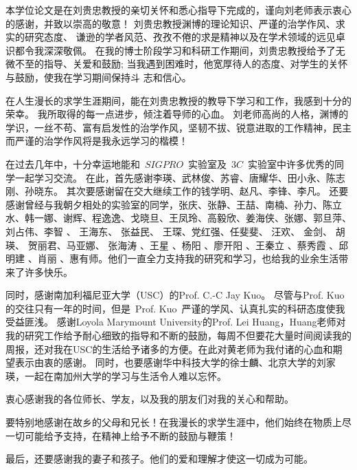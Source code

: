 \par 本学位论文是在刘贵忠教授的亲切关怀和悉心指导下完成的，谨向刘老师表示衷心的感谢，并致以崇高的敬意！
刘贵忠教授渊博的理论知识、严谨的治学作风、求实的研究态度、
谦逊的学者风范、孜孜不倦的求是精神以及在学术领域的远见卓识都令我深深敬佩。
在我的博士阶段学习和科研工作期间，刘贵忠教授给予了无微不至的指导、关爱和鼓励;
当我遇到困难时，他宽厚待人的态度、对学生的关怀与鼓励，使我在学习期间保持斗
志和信心。

在人生漫长的求学生涯期间，能在刘贵忠教授的教导下学习和工作，我感到十分的荣幸。
我所取得的每一点进步，倾注着导师的心血。
刘老师高尚的人格，渊博的学识，一丝不苟、富有启发性的治学作风，坚韧不拔、锐意进取的工作精神，民主而严谨的治学作风将是我永远学习的楷模！

\par 在过去几年中，十分幸运地能和~$SIGPRO$~实验室及~$3C$~实验室中许多优秀的同学一起学习交流。
在此，首先感谢李瑛、武林俊、苏睿、唐耀华、田小永、陈志刚、孙晓东。
其次要感谢留在交大继续工作的钱学明、赵凡、李锋、李凡。
还要感谢曾经与我朝夕相处的实验室的同学，张庆、张静、王喆、南楠、孙力、陈立水、韩一娜、谢辉、程逸逸、戈晓旦、王凤玲、高毅欣、姜海侠、张娜、郭旦萍、刘占伟、李智 、 王海东、 张益民、 王琛、党红强、任斐斐、 汪欢、 金剑、 胡瑛、 贺丽君、马亚娜、 张海涛 、王星 、杨阳 、廖开阳 、王秦立 、蔡秀霞 、邱明建 、肖丽 、惠有师。他们一直全力支持我的研究和学习，也给我的业余生活带来了许多快乐。

\par 同时，感谢南加利福尼亚大学（USC）的Prof. C.-C Jay Kuo。
尽管与Prof. Kuo的交往只有一年的时间，但是~Prof. Kuo~严谨的学风、认真扎实的科研态度使我受益匪浅。
感谢Loyola Marymount University的Prof. Lei Huang，Huang老师对我的研究工作给予耐心细致的指导和不断的鼓励，每周不但要花大量时间阅读我的周报，还对我在USC的生活给予诸多的方便。在此对黄老师为我付诸的心血和期望表示由衷的感谢。
同时，也要感谢华中科技大学的徐士麟、北京大学的刘家瑛，一起在南加州大学的学习与生活令人难以忘怀。

\par 衷心感谢我的各位师长、学友，以及我的朋友们对我的关心和帮助。 
\par 要特别地感谢在故乡的父母和兄长！在我漫长的求学生涯中，他们始终在物质上尽一切可能给予支持，在精神上给予不断的鼓励与鞭策！

\par 最后，还要感谢我的妻子和孩子。他们的爱和理解才使这一切成为可能。
